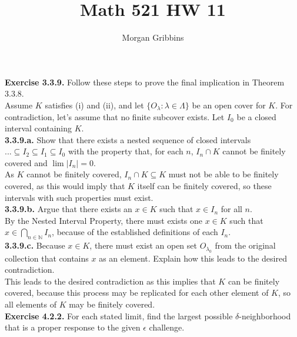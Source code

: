 \documentclass[12pt,letterpaper]{article}
\title{Math 521 HW 11}
\author{Morgan Gribbins}
\date{}
\begin{document}
	
\maketitle

\textbf{Exercise 3.3.9.} Follow these steps to prove the final implication in Theorem 3.3.8. \\

Assume \(K\) satisfies (i) and (ii), and let \(\{O_{\lambda} : \lambda \in \Lambda\}\) be an open cover for \(K\). For contradiction, let's assume that no finite subcover exists. Let \(I_{0}\) be a closed interval containing \(K\). \\

\textbf{3.3.9.a.} Show that there exists a nested sequence of closed intervals \(... \subseteq I_{2} \subseteq I_{1} \subseteq I_{0}\) with the property that, for each \(n\), \(I_{n} \cap K\) cannot be finitely covered and \(\lim |I_{n}| = 0.\) \\

As \(K\) cannot be finitely covered, \(I_{n} \cap K \subseteq K\) must not be able to be finitely covered, as this would imply that \(K\) itself can be finitely covered, so these intervals with such properties must exist. \\

\textbf{3.3.9.b.} Argue that there exists an \(x \in K\) such that \(x \in I_{n}\) for all \(n\). \\

By the Nested Interval Property, there must exists one \(x \in K\) such that \(x \in \bigcap_{n \in \mathbb{N}} I_{n}\), because of the established definitions of each \(I_{n}\).\\

\textbf{3.3.9.c.} Because \(x\in K\), there must exist an open set \(O_{\lambda_{0
}}\) from the original collection that contains \(x\) as an element. Explain how this leads to the desired contradiction. \\

This leads to the desired contradiction as this implies that \(K\) can be finitely covered, because this process may be replicated for each other element of \(K\), so all elements of \(K\) may be finitely covered. \\

\textbf{Exercise 4.2.2.} For each stated limit, find the largest possible \(\delta\)-neighborhood that is a proper response to the given \(\epsilon\) challenge. \\
\end{document}
